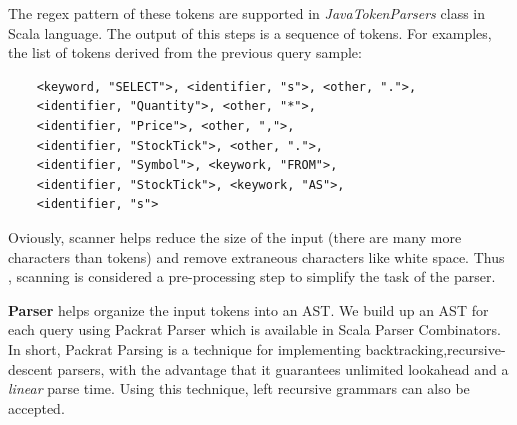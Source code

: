 The regex pattern of these tokens are supported in \textit{JavaTokenParsers} class in Scala language. The output of this steps is a sequence of tokens. For examples, the list of tokens derived from the previous query sample:
\begin{lstlisting}
	<keyword, "SELECT">, <identifier, "s">, <other, ".">,
	<identifier, "Quantity">, <other, "*">, 
	<identifier, "Price">, <other, ",">, 
	<identifier, "StockTick">, <other, ".">,
	<identifier, "Symbol">, <keywork, "FROM">,
	<identifier, "StockTick">, <keywork, "AS">, 
	<identifier, "s">   
\end{lstlisting}

Oviously, scanner helps reduce the size of the input (there are many more characters than tokens) and remove extraneous characters like white space. Thus  , scanning is considered a pre-processing step to simplify the task of the parser.

\textbf{Parser} helps organize the input tokens into an AST. We build up an AST for each query using Packrat Parser which is available in Scala Parser Combinators. 
In short, Packrat Parsing is a technique for implementing backtracking,recursive-descent parsers, with the advantage that it guarantees unlimited lookahead and a \textit{linear} parse time. Using this technique, left recursive grammars can also be accepted.

